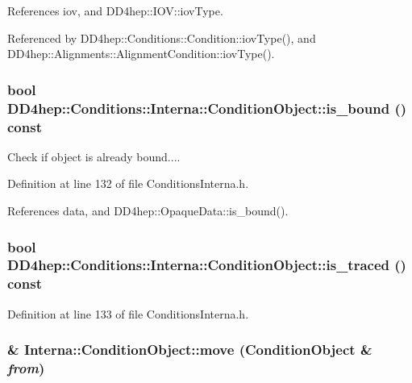 References iov, and DD4hep::IOV::iovType.

Referenced by DD4hep::Conditions::Condition::iovType(), and DD4hep::Alignments::AlignmentCondition::iovType().\hypertarget{class_d_d4hep_1_1_conditions_1_1_interna_1_1_condition_object_ae6c15b126361d1aec9e5e90c774d76f4}{
\subsubsection[{is\_\-bound}]{\setlength{\rightskip}{0pt plus 5cm}bool DD4hep::Conditions::Interna::ConditionObject::is\_\-bound () const}}
\label{class_d_d4hep_1_1_conditions_1_1_interna_1_1_condition_object_ae6c15b126361d1aec9e5e90c774d76f4}


Check if object is already bound.... 

Definition at line 132 of file ConditionsInterna.h.

References data, and DD4hep::OpaqueData::is\_\-bound().\hypertarget{class_d_d4hep_1_1_conditions_1_1_interna_1_1_condition_object_a511bc75333ecd5b0012dc4fddf8973c8}{
\subsubsection[{is\_\-traced}]{\setlength{\rightskip}{0pt plus 5cm}bool DD4hep::Conditions::Interna::ConditionObject::is\_\-traced () const}}
\label{class_d_d4hep_1_1_conditions_1_1_interna_1_1_condition_object_a511bc75333ecd5b0012dc4fddf8973c8}


Definition at line 133 of file ConditionsInterna.h.\hypertarget{class_d_d4hep_1_1_conditions_1_1_interna_1_1_condition_object_a2d944a3507299b38f69c5bd8b66494a5}{
\subsubsection[{move}]{ \& Interna::ConditionObject::move ({\bf ConditionObject} \& {\em from})}}
\label{class_d_d4hep_1_1_conditions_1_1_interna_1_1_condition_object_a2d944a3507299b38f69c5bd8b66494a5}


